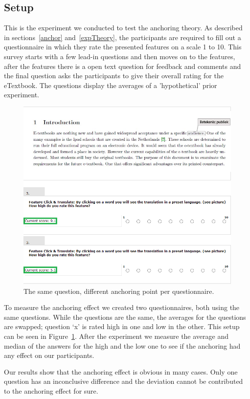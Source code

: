\documentclass[main.tex]{subfiles}
\begin{document}
\subsection{Setup}
This is the experiment we conducted to test the anchoring theory. As described in sections~\ref{anchor} and~\ref{expTheory}, the participants are required to fill out a questionnaire in which they rate the presented features on a scale 1 to 10. This survey starts with a few lead-in questions and then moves on to the features, after the features there is a open text question for feedback and comments and the final question asks the participants to give their overall rating for the eTextbook. The questions display the averages of a 'hypothetical' prior experiment.  

\begin{figure}
\includegraphics[width=1\textwidth]{QuestionComparison.png}
\caption{The same question, different anchoring point per questionnaire.}
\label{fig:qComp}
\end{figure}

To measure the anchoring effect we created two questionnaires, both using the same questions. While the questions are the same, the averages for the questions are swapped; question `x' is rated high in one and low in the other. This setup can be seen in Figure~\ref{fig:qComp}. After the experiment we measure the average and median of the answers for the high and the low one to see if the anchoring had any effect on our participants.

Our results show that the anchoring effect is obvious in many cases. Only one question has an inconclusive difference and the deviation cannot be contributed to the anchoring effect for sure.
\end{document}
